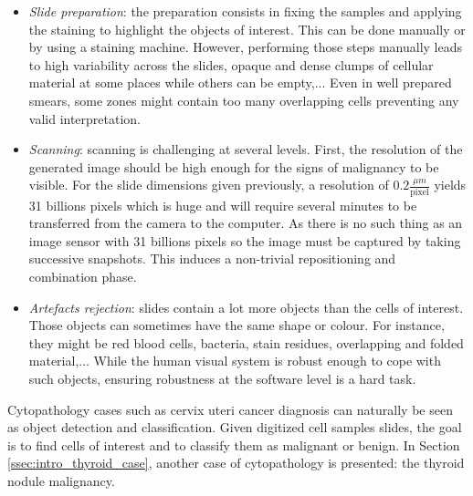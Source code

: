 \begin{itemize}
	\item \textit{Slide preparation}: the preparation consists in fixing the samples and applying the staining to highlight the objects of interest. This can be done manually or by using a staining machine. However, performing those steps manually leads to high variability across the slides, opaque and dense clumps of cellular material at some places while others can be empty,... Even in well prepared smears, some zones might contain too many overlapping cells preventing any valid interpretation. 
	\item \textit{Scanning}: scanning is challenging at several levels. First, the resolution of the generated image should be high enough for the signs of malignancy to be visible. For the slide dimensions given previously, a resolution of $0.2 \frac{\mu m}{\text{pixel}}$ yields 31 billions pixels which is huge and will require several minutes to be transferred from the camera to the computer. As there is no such thing as an image sensor with 31 billions pixels so the image must be captured by taking successive snapshots. This induces a non-trivial repositioning and combination phase.
	\item \textit{Artefacts rejection}: slides contain a lot more objects than the cells of interest. Those objects can sometimes have the same shape or colour. For instance, they might be red blood cells, bacteria, stain residues, overlapping and folded material,... While the human visual system is robust enough to cope with such objects, ensuring robustness at the software level is a hard task.
\end{itemize}

Cytopathology cases such as cervix uteri cancer diagnosis can naturally be seen as object detection and classification. Given digitized cell samples slides, the goal is to find cells of interest and to classify them as malignant or benign. In Section \ref{ssec:intro_thyroid_case}, another case of cytopathology is presented: the thyroid nodule malignancy. 

